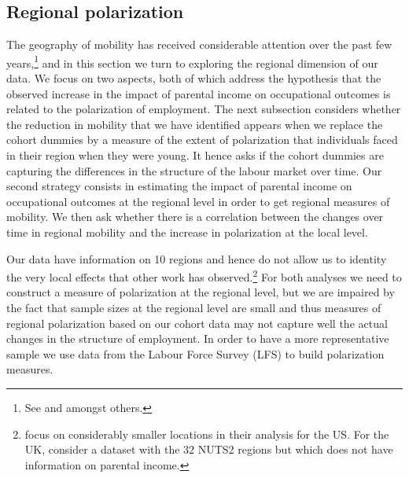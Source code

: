 \subsection{Regional polarization}

The geography of mobility has received considerable attention over the past few years,\footnote{See \cite{Chetty2014Land} and \cite{Bell2018Land} amongst others.} and in this section we turn to exploring the regional dimension of our data. We focus on two aspects, both of which address the hypothesis that the observed increase in the impact of parental income on occupational outcomes is related to the polarization of employment. The next subsection considers whether the reduction in mobility that we have identified appears when we replace the cohort dummies by a measure of the extent of polarization that individuals faced in their region when they were young. It hence asks if the cohort dummies are capturing the differences in the structure of the labour market over time. Our second strategy consists in estimating the impact of parental income on occupational outcomes at the regional level in order to get regional measures of mobility. We then ask whether there is a correlation between the changes over time in regional mobility and the increase in polarization at the local level.

Our data have information on 10 regions and hence do not allow us to identity the very local effects that other work has observed.\footnote{\cite{Chetty2014Land} focus on considerably smaller locations in their analysis for the US. For the UK, \cite{Bell2018Land} consider a dataset with the 32 NUTS2 regions but which does not have information on parental income.} For both analyses we need to construct a measure of polarization at the regional level, but we are impaired by the fact that sample sizes at the regional level are small and thus measures of regional polarization based on our cohort data may not capture well the actual changes in the structure of employment. In order to have a more representative sample we use data from the Labour Force Survey (LFS) to build polarization measures. 

